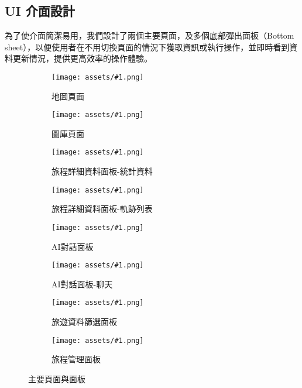 
\subsection{UI 介面設計}

為了使介面簡潔易用，我們設計了兩個主要頁面，及多個底部彈出面板（Bottom sheet），以便使用者在不用切換頁面的情況下獲取資訊或執行操作，並即時看到資料更新情況，提供更高效率的操作體驗。

\newcommand{\customsubfig}[1]{
    \hspace{0.01\textwidth}
    \begin{subfigure}[t]{0.18\textwidth}
        \centering
        \texttt{[image: assets/\#1.png]}
        \caption{#1}
        \label{#1}
    \end{subfigure}
    \hspace{0.01\textwidth}
}

\begin{figure}[H]
    \centering
    \customsubfig{地圖頁面}
    \customsubfig{圖庫頁面}
    \customsubfig{旅程詳細資料面板-統計資料}
    \customsubfig{旅程詳細資料面板-軌跡列表}

    \vspace{0.5em}

    \customsubfig{AI對話面板}
    \customsubfig{AI對話面板-聊天}
    \customsubfig{旅遊資料篩選面板}
    \customsubfig{旅程管理面板}

    \caption{主要頁面與面板}
    \label{主要頁面與面板}
\end{figure}

\let\customsubfig\relax

